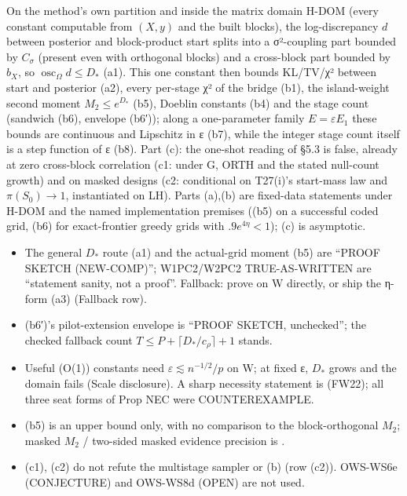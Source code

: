 \begin{plain}
On the method's own partition and inside the matrix domain H-DOM (every constant computable from $(X,y)$ and the built blocks), the log-discrepancy $d$ between posterior and block-product start splits into a σ²-coupling part bounded by $C_{\sigma}$ (present even with orthogonal blocks) and a cross-block part bounded by $b_X$, so $\operatorname{osc}_{\Omega} d\le D_{*}$ (a1). This one constant then bounds KL/TV/χ² between start and posterior (a2), every per-stage χ² of the bridge (b1), the island-weight second moment $M_2\le e^{D_{*}}$ (b5), Doeblin constants (b4) and the stage count (sandwich (b6), envelope (b6′)); along a one-parameter family $E=\varepsilon E_1$ these bounds are continuous and Lipschitz in ε (b7), while the integer stage count itself is a step function of ε (b8). Part (c): the one-shot reading of §5.3 is false, already at zero cross-block correlation (c1: under G, ORTH and the stated null-count growth) and on masked designs (c2: conditional on T27(i)'s start-mass law and $\pi(S_0)\to1$, instantiated on LH). Parts (a),(b) are fixed-data statements under H-DOM and the named implementation premises ((b5) on a successful coded grid, (b6) for exact-frontier greedy grids with $.9e^{4\eta}<1$); (c) is asymptotic.
\end{plain}

\begin{notproved}
\begin{itemize}
\item The general $D_{*}$ route (a1) and the actual-grid moment (b5) are ``PROOF SKETCH (NEW-COMP)''; W1PC2/W2PC2 TRUE-AS-WRITTEN are ``statement sanity, not a proof''. Fallback: prove on W directly, or ship the η-form (a3) (Fallback row).
\item (b6′)'s pilot-extension envelope is ``PROOF SKETCH, unchecked''; the checked fallback count $T\le P+\lceil D_{*}/c_{\rho}\rceil+1$ stands.
\item Useful (O(1)) constants need $\varepsilon\lesssim n^{-1/2}/p$ on W; at fixed ε, $D_{*}$ grows and the domain fails (Scale disclosure). A sharp necessity statement is  (FW22); all three seat forms of Prop NEC were COUNTEREXAMPLE.
\item (b5) is an upper bound only, with no comparison to the block-orthogonal $M_2$; masked $M_2$ / two-sided masked evidence precision is .
\item (c1), (c2) do not refute the multistage sampler or (b) (row (c2)). OWS-WS6e (CONJECTURE) and OWS-WS8d (OPEN) are not used.
\end{itemize}
\end{notproved}

